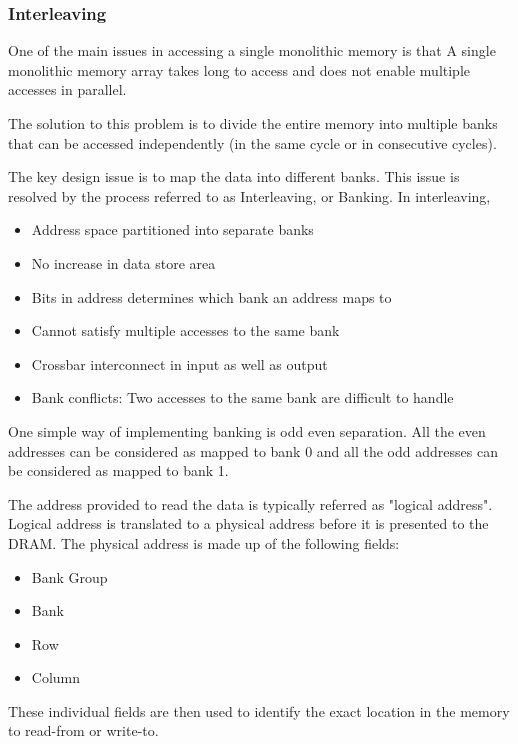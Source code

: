 \subsubsection{Interleaving}
One of the main issues in accessing a single monolithic memory is that A single monolithic memory array takes long to access and does not enable multiple accesses in parallel.

\par The solution to this problem is to divide the entire memory into multiple banks that can be accessed independently (in the same cycle or in consecutive cycles).

\par The key design issue is to map the data into different banks. This issue is resolved by the process referred to as Interleaving, or Banking. In interleaving, 
\begin{itemize}
    \item Address space partitioned into separate banks
    \item No increase in data store area
    \item Bits in address determines which bank an address maps to
    \item Cannot satisfy multiple accesses to the same bank
    \item Crossbar interconnect in input as well as output
    \item Bank conflicts: Two accesses to the same bank are difficult to handle
\end{itemize}

One simple way of implementing banking is odd even separation. All the even addresses can be considered as mapped to bank 0 and all the odd addresses can be considered as mapped to bank 1.

\par The address provided to read the data is typically referred as "logical address". Logical address is translated to a physical address before it is presented to the DRAM. The physical address is made up of the following fields:
\begin{itemize}
	\item Bank Group
	\item Bank
	\item Row
	\item Column
\end{itemize} 

These individual fields are then used to identify the exact location in the memory to read-from or write-to. 

